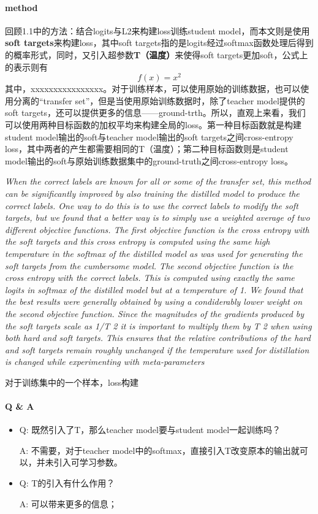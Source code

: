 \documentclass[11pt]{article} %
\begin{document}
\begin{CJK}{UTF8}{gkai}
\paragraph{method}
回顾1.1中的方法：结合logits与L2来构建loss训练student model，而本文则是使用\textbf{soft targets}来构建loss，其中soft targets指的是logits经过softmax函数处理后得到的概率形式，同时，又引入超参数\textbf{T（温度）}来使得soft targets更加soft，公式上的表示则有	
\begin{equation*}
f(x) = x^2
\end{equation*}
其中，xxxxxxxxxxxxxxxx。对于训练样本，可以使用原始的训练数据，也可以使用分离的“transfer set”，但是当使用原始训练数据时，除了teacher model提供的soft targets，还可以提供更多的信息——ground-trth。所以，直观上来看，我们可以使用两种目标函数的加权平均来构建全局的loss。第一种目标函数就是构建student model输出的soft与teacher model输出的soft targets之间cross-entropy loss，其中两者的产生都需要相同的T（温度）；第二种目标函数则是student model输出的soft与原始训练数据集中的ground-truth之间cross-entropy loss。
\par \emph{When the correct labels are known for all or some of the transfer set, this method can be significantly improved by also training the distilled model to produce the correct labels. One way to do this is to use the correct labels to modify the soft targets, but we found that a better way is to simply use a weighted average of two different objective functions. The first objective function is the cross entropy with the soft targets and this cross entropy is computed using the same high temperature in the softmax of the distilled model as was used for generating the soft targets from the cumbersome model. The second objective function is the cross entropy with the correct labels. This is computed using exactly the same logits in softmax of the distilled model but at a temperature of 1. We found that the best results were generally obtained by using a condiderably lower weight on the second objective function. Since the magnitudes of the gradients produced by the soft targets scale as 1/T 2 it is important to multiply them by T 2 when using both hard and soft targets. This ensures that the relative contributions of the hard and soft targets remain roughly unchanged if the temperature used for distillation is changed while experimenting with meta-parameters}
\par
对于训练集中的一个样本，loss构建
\paragraph{Q \& A}
\begin{itemize}
\item
Q: 既然引入了T，那么teacher model要与student model一起训练吗？\par
A: 不需要，对于teacher model中的softmax，直接引入T改变原本的输出就可以，并未引入可学习参数。
\item
Q:  T的引入有什么作用？\par
A: 可以带来更多的信息；
\end{itemize}

\end{CJK}
\end{document}
